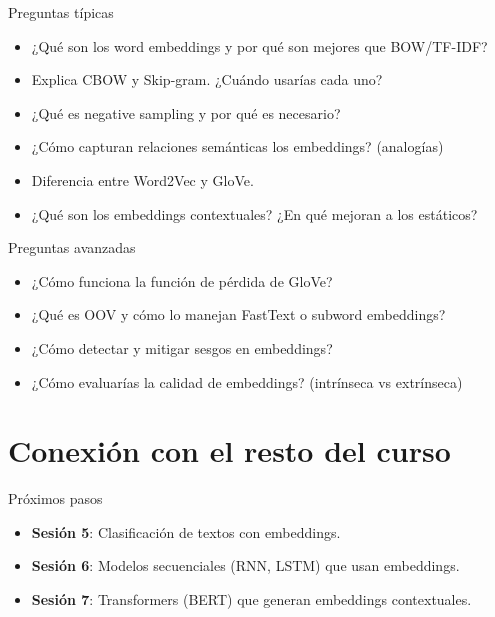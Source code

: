 \documentclass[aspectratio=169, 10pt, xcolor=table]{beamer}
\begin{document}
\begin{frame}{Preguntas típicas}
    \begin{itemize}
        \item ¿Qué son los word embeddings y por qué son mejores que BOW/TF-IDF?
        \item Explica CBOW y Skip-gram. ¿Cuándo usarías cada uno?
        \item ¿Qué es negative sampling y por qué es necesario?
        \item ¿Cómo capturan relaciones semánticas los embeddings? (analogías)
        \item Diferencia entre Word2Vec y GloVe.
        \item ¿Qué son los embeddings contextuales? ¿En qué mejoran a los estáticos?
    \end{itemize}
\end{frame}

\begin{frame}{Preguntas avanzadas}
    \begin{itemize}
        \item ¿Cómo funciona la función de pérdida de GloVe?
        \item ¿Qué es OOV y cómo lo manejan FastText o subword embeddings?
        \item ¿Cómo detectar y mitigar sesgos en embeddings?
        \item ¿Cómo evaluarías la calidad de embeddings? (intrínseca vs extrínseca)
    \end{itemize}
\end{frame}

\section{Conexión con el resto del curso}

\begin{frame}{Próximos pasos}
    \begin{itemize}
        \item \textbf{Sesión 5}: Clasificación de textos con embeddings.
        \item \textbf{Sesión 6}: Modelos secuenciales (RNN, LSTM) que usan embeddings.
        \item \textbf{Sesión 7}: Transformers (BERT) que generan embeddings contextuales.
    \end{itemize}
\end{frame}
\end{document}
